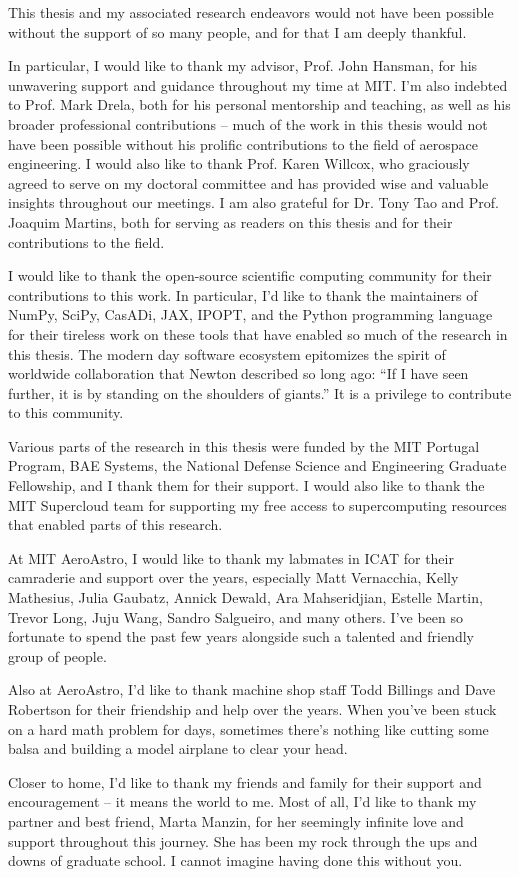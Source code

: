 This thesis and my associated research endeavors would not have been possible without the support of so many people, and for that I am deeply thankful.

In particular, I would like to thank my advisor, Prof. John Hansman, for his unwavering support and guidance throughout my time at MIT. I'm also indebted to Prof. Mark Drela, both for his personal mentorship and teaching, as well as his broader professional contributions -- much of the work in this thesis would not have been possible without his prolific contributions to the field of aerospace engineering. I would also like to thank Prof. Karen Willcox, who graciously agreed to serve on my doctoral committee and has provided wise and valuable insights throughout our meetings. I am also grateful for Dr. Tony Tao and Prof. Joaquim Martins, both for serving as readers on this thesis and for their contributions to the field.

I would like to thank the open-source scientific computing community for their contributions to this work. In particular, I'd like to thank the maintainers of NumPy, SciPy, CasADi, JAX, IPOPT, and the Python programming language for their tireless work on these tools that have enabled so much of the research in this thesis. The modern day software ecosystem epitomizes the spirit of worldwide collaboration that Newton described so long ago: ``If I have seen further, it is by standing on the shoulders of giants.'' It is a privilege to contribute to this community.

Various parts of the research in this thesis were funded by the MIT Portugal Program, BAE Systems, the National Defense Science and Engineering Graduate Fellowship, and I thank them for their support. I would also like to thank the MIT Supercloud team for supporting my free access to supercomputing resources that enabled parts of this research.

At MIT AeroAstro, I would like to thank my labmates in ICAT for their camraderie and support over the years, especially Matt Vernacchia, Kelly Mathesius, Julia Gaubatz, Annick Dewald, Ara Mahseridjian, Estelle Martin, Trevor Long, Juju Wang, Sandro Salgueiro, and many others. I've been so fortunate to spend the past few years alongside such a talented and friendly group of people.

Also at AeroAstro, I'd like to thank machine shop staff Todd Billings and Dave Robertson for their friendship and help over the years. When you've been stuck on a hard math problem for days, sometimes there's nothing like cutting some balsa and building a model airplane to clear your head.

Closer to home, I'd like to thank my friends and family for their support and encouragement -- it means the world to me. Most of all, I'd like to thank my partner and best friend, Marta Manzin, for her seemingly infinite love and support throughout this journey. She has been my rock through the ups and downs of graduate school. I cannot imagine having done this without you.